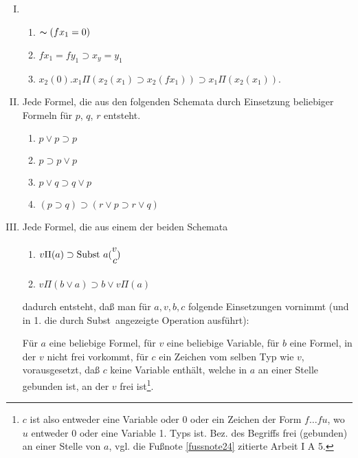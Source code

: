 \documentclass[draft]{scrartcl}
\begin{document}
\begin{enumerate}[I.]
	\item \begin{enumerate}[1.]
		\item $\thicksim\left(fx_1 = 0\right)$
		\item $fx_1 = fy_1 \supset x_y = y_1$
		\item $x_2\left(0\right).x_1\Pi\left(x_2\left(x_1\right) \supset x_2\left(fx_1\right)\right) \supset x_1 \Pi \left(x_2\left(x_1\right)\right)$.
	\end{enumerate}
	\item Jede Formel, die aus den folgenden Schemata
	durch Einsetzung beliebiger Formeln für $p$, $q$,
	$r$ entsteht.
	\begin{enumerate}[1.]
		\item $p\lor p\supset p$
		\item $p \supset p \lor p$
		\item $p \lor q \supset q \lor p$
		\item $\left(p \supset q\right) \supset \left(r \lor p \supset r \lor q\right)$
	\end{enumerate}

	\item Jede Formel, die aus einem der beiden Schemata

	\begin{enumerate}[1.]
		\item $v\Pi\left(a\right) \supset \text{Subst\ } a \Spvek{v; c}$
		\item $v\Pi\left(b \lor a\right)\supset b \lor v \Pi\left(a\right)$
	\end{enumerate}
	dadurch entsteht, daß man für $a, v, b, c$ folgende
	Einsetzungen vornimmt (und in 1. die durch \glqq Subst\grqq\ angezeigte Operation ausführt):

	Für $a$ eine beliebige Formel, für $v$ eine beliebige Variable, für $b$ eine Formel,
	in der $v$ nicht frei vorkommt, für $c$ ein Zeichen vom selben Typ wie $v$,
	vorausgesetzt, daß $c$ keine Variable enthält, welche in $a$ an einer Stelle
	gebunden ist, an der $v$ frei ist\footnote{$c$ ist also entweder eine Variable
	oder 0 oder ein Zeichen der Form $f \dots fu$, wo $u$ entweder 0 oder eine
	Variable 1. Typs ist. Bez. des Begriffs \glqq frei (gebunden) an einer Stelle
	von $a$\grqq, vgl. die Fußnote \ref{fussnote24} zitierte Arbeit I A 5.}.


\end{enumerate}
\end{document}
